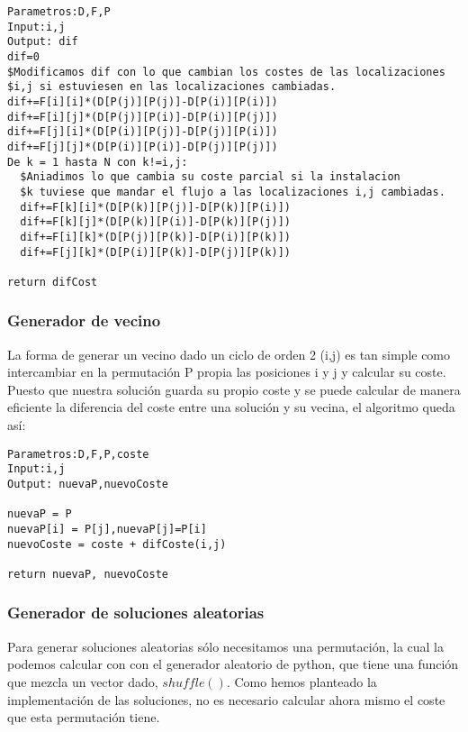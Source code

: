 \hline
\begin{lstlisting}
Parametros:D,F,P
Input:i,j
Output: dif
dif=0
$Modificamos dif con lo que cambian los costes de las localizaciones
$i,j si estuviesen en las localizaciones cambiadas.
dif+=F[i][i]*(D[P(j)][P(j)]-D[P(i)][P(i)])
dif+=F[i][j]*(D[P(j)][P(i)]-D[P(i)][P(j)])
dif+=F[j][i]*(D[P(i)][P(j)]-D[P(j)][P(i)])
dif+=F[j][j]*(D[P(i)][P(i)]-D[P(j)][P(j)])
De k = 1 hasta N con k!=i,j:
  $Aniadimos lo que cambia su coste parcial si la instalacion
  $k tuviese que mandar el flujo a las localizaciones i,j cambiadas.
  dif+=F[k][i]*(D[P(k)][P(j)]-D[P(k)][P(i)])
  dif+=F[k][j]*(D[P(k)][P(i)]-D[P(k)][P(j)])
  dif+=F[i][k]*(D[P(j)][P(k)]-D[P(i)][P(k)])
  dif+=F[j][k]*(D[P(i)][P(k)]-D[P(j)][P(k)])
  
return difCost
\end{lstlisting}
\hline

\subsubsection{Generador de vecino}
La forma de generar un vecino dado un ciclo de orden 2 (i,j) es tan simple como intercambiar en la permutación P propia las posiciones i y j y calcular su coste. Puesto que nuestra solución guarda su propio coste y se puede calcular de manera eficiente la diferencia del coste entre una solución y su vecina, el algoritmo queda así:\\

\hline
\begin{lstlisting}
Parametros:D,F,P,coste
Input:i,j
Output: nuevaP,nuevoCoste

nuevaP = P
nuevaP[i] = P[j],nuevaP[j]=P[i]
nuevoCoste = coste + difCoste(i,j)

return nuevaP, nuevoCoste
\end{lstlisting}
\hline



\subsubsection{Generador de soluciones aleatorias}

Para generar soluciones aleatorias sólo necesitamos una permutación, la cual la podemos calcular con con el generador aleatorio de python, que tiene una función que mezcla un vector dado, $shuffle()$. Como hemos planteado la implementación de las soluciones, no es necesario calcular ahora mismo el coste que esta permutación tiene.\\

